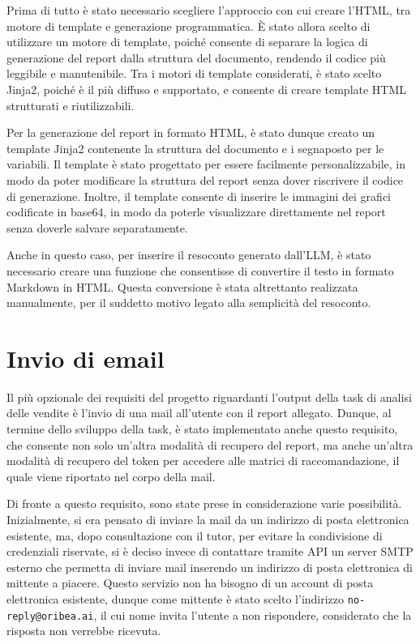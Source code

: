 Prima di tutto è stato necessario scegliere l'approccio con cui creare l'HTML, tra motore di template e generazione programmatica. È stato allora scelto di utilizzare un motore di template, poiché consente di separare la logica di generazione del report dalla struttura del documento, rendendo il codice più leggibile e manutenibile. Tra i motori di template considerati, è stato scelto Jinja2, poiché è il più diffuso e supportato, e consente di creare template HTML strutturati e riutilizzabili.

Per la generazione del report in formato HTML, è stato dunque creato un template Jinja2 contenente la struttura del documento e i segnaposto per le variabili. Il template è stato progettato per essere facilmente personalizzabile, in modo da poter modificare la struttura del report senza dover riscrivere il codice di generazione. Inoltre, il template consente di inserire le immagini dei grafici codificate in base64, in modo da poterle visualizzare direttamente nel report senza doverle salvare separatamente.

Anche in questo caso, per inserire il resoconto generato dall'LLM, è stato necessario creare una funzione che consentisse di convertire il testo in formato Markdown in HTML. Questa conversione è stata altrettanto realizzata manualmente, per il suddetto motivo legato alla semplicità del resoconto.


\section{Invio di email}

Il più opzionale dei requisiti del progetto riguardanti l'output della task di analisi delle vendite è l'invio di una mail all'utente con il report allegato. Dunque, al termine dello sviluppo della task, è stato implementato anche questo requisito, che consente non solo un'altra modalità di recupero del report, ma anche un'altra modalità di recupero del token per accedere alle matrici di raccomandazione, il quale viene riportato nel corpo della mail.

Di fronte a questo requisito, sono state prese in considerazione varie possibilità.
Inizialmente, si era pensato di inviare la mail da un indirizzo di posta elettronica esistente, ma, dopo consultazione con il tutor, per evitare la condivisione di credenziali riservate, si è deciso invece di contattare tramite API un server SMTP esterno che permetta di inviare mail inserendo un indirizzo di posta elettronica di mittente a piacere. Questo servizio non ha bisogno di un account di posta elettronica esistente, dunque come mittente è stato scelto l'indirizzo \texttt{no-reply@oribea.ai}, il cui nome invita l'utente a non rispondere, considerato che la risposta non verrebbe ricevuta.

